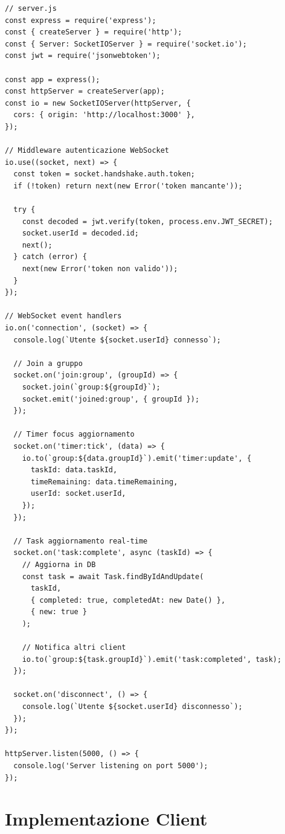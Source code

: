 \documentclass[12pt,a4paper]{report}
\begin{document}
\begin{lstlisting}
// server.js
const express = require('express');
const { createServer } = require('http');
const { Server: SocketIOServer } = require('socket.io');
const jwt = require('jsonwebtoken');

const app = express();
const httpServer = createServer(app);
const io = new SocketIOServer(httpServer, {
  cors: { origin: 'http://localhost:3000' },
});

// Middleware autenticazione WebSocket
io.use((socket, next) => {
  const token = socket.handshake.auth.token;
  if (!token) return next(new Error('token mancante'));
  
  try {
    const decoded = jwt.verify(token, process.env.JWT_SECRET);
    socket.userId = decoded.id;
    next();
  } catch (error) {
    next(new Error('token non valido'));
  }
});

// WebSocket event handlers
io.on('connection', (socket) => {
  console.log(`Utente ${socket.userId} connesso`);
  
  // Join a gruppo
  socket.on('join:group', (groupId) => {
    socket.join(`group:${groupId}`);
    socket.emit('joined:group', { groupId });
  });
  
  // Timer focus aggiornamento
  socket.on('timer:tick', (data) => {
    io.to(`group:${data.groupId}`).emit('timer:update', {
      taskId: data.taskId,
      timeRemaining: data.timeRemaining,
      userId: socket.userId,
    });
  });
  
  // Task aggiornamento real-time
  socket.on('task:complete', async (taskId) => {
    // Aggiorna in DB
    const task = await Task.findByIdAndUpdate(
      taskId,
      { completed: true, completedAt: new Date() },
      { new: true }
    );
    
    // Notifica altri client
    io.to(`group:${task.groupId}`).emit('task:completed', task);
  });
  
  socket.on('disconnect', () => {
    console.log(`Utente ${socket.userId} disconnesso`);
  });
});

httpServer.listen(5000, () => {
  console.log('Server listening on port 5000');
});
\end{lstlisting}

\section{Implementazione Client}
\end{document}
